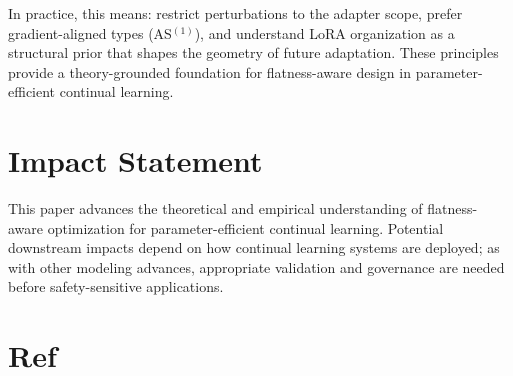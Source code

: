 \documentclass[10pt]{article} %
\begin{document}
In practice, this means: restrict perturbations to the adapter scope, prefer gradient-aligned types (AS$^{(1)}$), and understand LoRA organization as a structural prior that shapes the geometry of future adaptation.
These principles provide a theory-grounded foundation for flatness-aware design in parameter-efficient continual learning.

\section*{Impact Statement}
This paper advances the theoretical and empirical understanding of flatness-aware optimization for parameter-efficient continual learning.
Potential downstream impacts depend on how continual learning systems are deployed; as with other modeling advances, appropriate validation and governance are needed before safety-sensitive applications.




\section{Ref}




\appendix



\end{document}
